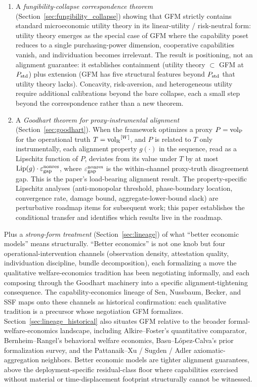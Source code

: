 \begin{enumerate}
\item A \emph{fungibility-collapse correspondence theorem}
  (Section~\ref{sec:fungibility_collapse}) showing that GFM
  strictly contains standard microeconomic utility theory in its
  linear-utility / risk-neutral form: utility theory emerges as
  the special case of GFM where the capability poset reduces to a
  single purchasing-power dimension, cooperative capabilities
  vanish, and individuation becomes irrelevant.  The result is
  positioning, not an alignment guarantee: it establishes
  containment (utility theory $\subset$ GFM at $P_{\mathrm{std}}$) plus
  extension (GFM has five structural features beyond $P_{\mathrm{std}}$
  that utility theory lacks).  Concavity, risk-aversion, and
  heterogeneous utility require additional calibrations beyond
  the bare collapse, each a small step beyond the correspondence
  rather than a new theorem.

\item A \emph{Goodhart theorem for proxy-instrumental alignment}
  (Section~\ref{sec:goodhart}).  When the framework optimizes a
  proxy $P = {\operatorname{vol}_{\mathrm{P}}}$ for the operational truth $T = {\operatorname{vol}_{\mathrm{R}}}^{[W]}$, and
  $P$ is related to $T$ only instrumentally, each alignment
  property $g(\cdot)$ in the sequence, read as a Lipschitz
  function of $P$, deviates from its value under $T$ by at most
  $\mathrm{Lip}(g) \cdot \varepsilon_{\mathrm{gap}}^{\mathrm{nonres}}$, where $\varepsilon_{\mathrm{gap}}^{\mathrm{nonres}}$ is the
  within-channel proxy-truth disagreement gap.  This is the
  paper's load-bearing alignment result.  The property-specific
  Lipschitz analyses (anti-monopolar threshold, phase-boundary
  location, convergence rate, damage bound, aggregate-lower-bound
  slack) are perturbative roadmap items for subsequent work; this
  paper establishes the conditional transfer and identifies which
  results live in the roadmap.
\end{enumerate}

Plus a \emph{strong-form treatment} (Section~\ref{sec:lineage})
of what ``better economic models'' means structurally.  ``Better
economics'' is not one knob but four operational-intervention
channels (observation density, attestation quality, individuation
discipline, bundle decomposition), each formalizing a move the
qualitative welfare-economics tradition has been negotiating
informally, and each composing through the Goodhart machinery into
a specific alignment-tightening consequence.  The
capability-economics lineage of Sen, Nussbaum, Becker, and SSF
maps onto these channels as historical confirmation: each
qualitative tradition is a precursor whose negotiation GFM
formalizes.  Section~\ref{sec:lineage_historical} also situates
GFM relative to the broader formal-welfare-economics landscape,
including Alkire--Foster's quantitative comparator,
Bernheim--Rangel's behavioral welfare economics,
Basu--L\'opez-Calva's prior formalization survey, and the
Pattanaik--Xu / Sugden / Adler axiomatic-aggregation neighbors.
Better economic models are tighter alignment guarantees, above
the deployment-specific residual-class floor where capabilities
exercised without material or time-displacement footprint
structurally cannot be witnessed.


